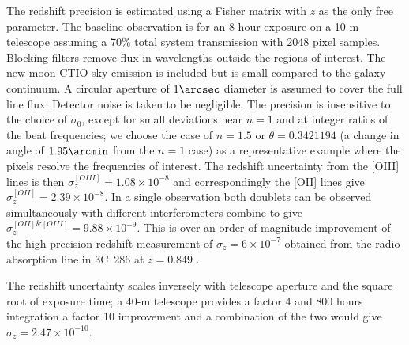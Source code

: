 \documentclass[preprint]{aastex}
\begin{document}
The redshift precision is estimated using a Fisher matrix with $z$ as the only free parameter. 
The baseline observation is for an 8-hour exposure on a 10-m telescope assuming a 70\% total
system transmission
with 2048 pixel samples. 
Blocking filters remove flux in wavelengths outside the regions
of interest.  The new moon CTIO sky emission is included but
is small compared to the galaxy continuum.
A circular aperture of $1\arcsec$ diameter is assumed to cover the full line flux.  Detector noise is taken to be negligible.
The precision is insensitive to the choice of $\sigma_0$, except
for small deviations near $n=1$ and at integer ratios of the beat frequencies; we choose
the case of $n=1.5$ or $\theta = 0.3421194$ (a change in angle of $1.95 \arcmin$ from the $n=1$ case)
as a representative example where the pixels resolve the frequencies of interest.
The redshift uncertainty from the [OIII] lines is then $\sigma_z^{[OIII]}=1.08\times 10^{-8}$
and correspondingly the [OII] lines give $\sigma_z^{[OII]}=2.39\times 10^{-8}$.  In a single observation
both doublets can be observed simultaneously with different interferometers combine to
give $\sigma_z^{[OII]\&[OIII]}=9.88\times 10^{-9}$.
This is over an order of magnitude improvement
of the high-precision redshift measurement of  $\sigma_z=6\times 10^{-7}$ obtained
from the radio absorption line in 3C~286 at $z=0.849$
\citep{1978ApJ...219....1D}.

The redshift uncertainty scales inversely with telescope aperture and the square root of exposure time;
a 40-m telescope provides a factor 4 and 800 hours integration a factor 10 improvement and a combination
of the two would give $\sigma_z=2.47\times 10^{-10}$. 
\end{document}
